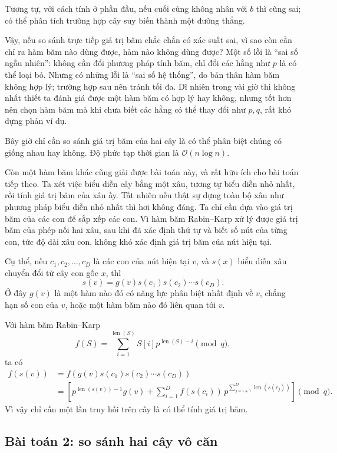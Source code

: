\documentclass[11pt]{article}
\newcommand{\Oh}{\mathcal{O}}
\begin{document}
Tương tự, với cách tính ở phần đầu, nếu cuối cùng không nhân với $b$ thì cũng
sai; có thể phân tích trường hợp cây suy biến thành một đường thẳng.

Vậy, nếu so sánh trực tiếp giá trị băm chắc chắn có xác suất sai, vì sao còn
cần chỉ ra hàm băm nào dùng được, hàm nào không dùng được? Một số lỗi là
``sai số ngẫu nhiên'': không cần đổi phương pháp tính băm, chỉ đổi các hằng
như $p$ là có thể loại bỏ. Nhưng có những lỗi là ``sai số hệ thống'', do bản
thân hàm băm không hợp lý; trường hợp sau nên tránh tối đa. Dĩ nhiên trong
vài giờ thi không nhất thiết ta đánh giá được một hàm băm có hợp lý hay
không, nhưng tốt hơn nên chọn hàm băm mà khi chưa biết các hằng có thể thay
đổi như $p,q$, rất khó dựng phản ví dụ.

Bây giờ chỉ cần so sánh giá trị băm của hai cây là có thể phân biệt chúng có
giống nhau hay không. Độ phức tạp thời gian là $\Oh(n\log n)$.

Còn một hàm băm khác cũng giải được bài toán này, và rất hữu ích cho bài toán
tiếp theo. Ta xét việc biểu diễn cây bằng một xâu, tương tự biểu diễn nhỏ
nhất, rồi tính giá trị băm của xâu ấy. Tất nhiên nếu thật sự dựng toàn bộ xâu
như phương pháp biểu diễn nhỏ nhất thì hơi không đáng. Ta chỉ cần dựa vào giá
trị băm của các con để sắp xếp các con. Vì hàm băm Rabin--Karp xử lý được
giá trị băm của phép nối hai xâu, sau khi đã xác định thứ tự và biết số nút
của từng con, tức độ dài xâu con, không khó xác định giá trị băm của nút hiện
tại.

Cụ thể, nếu $c_1,c_2,\ldots,c_D$ là các con của nút hiện tại $v$, và $s(x)$
biểu diễn xâu chuyển đổi từ cây con gốc $x$, thì
\[
  s(v)=g(v)s(c_1)s(c_2)\cdots s(c_D).
\]
Ở đây $g(v)$ là một hàm nào đó có năng lực phân biệt nhất định về $v$, chẳng
hạn số con của $v$, hoặc một hàm băm nào đó liên quan tới $v$.

Với hàm băm Rabin--Karp
\[
  f(S)=\sum_{i=1}^{\operatorname{len}(S)}
  S[i]p^{\operatorname{len}(S)-i}\pmod q,
\]
ta có
\[
\begin{aligned}
  f(s(v))
  &=
  f(g(v)s(c_1)s(c_2)\cdots s(c_D))\\
  &=
  \left[
    p^{\operatorname{len}(s(v))-1}g(v)
    +
    \sum_{i=1}^{D}
      f(s(c_i))\,
      p^{\sum_{j=i+1}^{D}\operatorname{len}(s(c_j))}
  \right]\pmod q.
\end{aligned}
\]
Vì vậy chỉ cần một lần truy hồi trên cây là có thể tính giá trị băm.

\subsection{Bài toán 2: so sánh hai cây vô căn}
\end{document}
